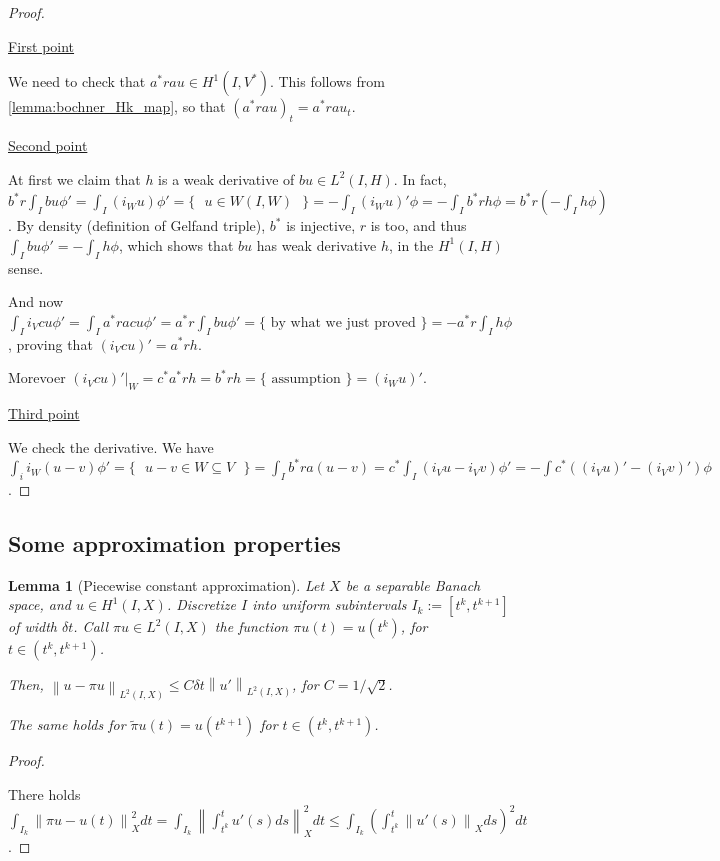 \documentclass[english,a4paper,9pt,oneside]{scrbook}	%
\theoremstyle{break}
\newtheorem{lemma}[equation]{Lemma}
\newenvironment{mproof}[1][\proofname]{%
  \begin{proof}[#1]$ $\par\nobreak\ignorespaces
}{%
  \end{proof}
}
\renewcommand*{\proofname}{Proof}
\theoremstyle{remark}
\newcommand{\ds}{\displaystyle}
\newcommand{\norm}[1]{\left\lVert#1\right\rVert}
\newcommand{\ind}[1]{\{\text{ #1 }\}}
\newcommand{\mind}[1]{$#1$}
\begin{document}
\begin{appendices}
\begin{mproof}
\underline{First point}

We need to check that $a^* r a u \in H^1(I, V^*)$. This follows from \cref{lemma:bochner_Hk_map}, so that $(a^* r a u)_t = a^* r a u_t$.

\underline{Second point}

At first we claim that $h$ is a weak derivative of $bu \in L^2(I,H)$. In fact, $b^* r \int_I bu \phi' = \int_I (i_W u)\phi' = \ind{\mind{u \in W(I,W)}} =-\int_I(i_Wu)'\phi=-\int_I b^*r h\phi = b^*r (-\int_I h \phi)$. By density (definition of Gelfand triple), $b^*$ is injective, $r$ is too, and thus $\int_I bu \phi' = -\int_I h \phi$, which shows that $bu$ has weak derivative $h$, in the $H^1(I,H)$ sense.

And now $\int_I i_V c u \phi'= \int_I a^*racu \phi' = a^*r\int_I bu\phi' = \ind{by what we just proved}=-a^*r \int_I h \phi$, proving that $(i_V cu)'=a^*r h$.

Morevoer $(i_V cu)'|_W = c^*a^*r h=b^*rh=\ind{assumption} = (i_W u)'$.

\underline{Third point}

We check the derivative. We have $\int_i i_W(u-v)\phi' =\ind{\mind{u-v \in W\subseteq V}} = \int_I b^* r a (u-v) = c^*\int_I(i_Vu - i_Vv)\phi' = -\int c^*((i_V u)'- (i_V v)')\phi$.

\end{mproof}

\subsection{Some approximation properties}

\begin{lemma}[Piecewise constant approximation]
\label{lemma:pw_constant_appr}
Let $X$ be a separable Banach space, and $u \in H^1(I,X)$. Discretize $I$ into uniform subintervals $I_k:=[t^k,t^{k+1}]$ of width $\delta t$. Call $\pi u \in L^2(I,X)$ the function $\pi u(t)=u(t^{k})$, for $t \in (t^k,t^{k+1})$.

Then, $\norm{u-\pi u}_{L^2(I,X)}\leq C \delta t \norm{u'}_{L^2(I,X)}$, for $C=1/\sqrt{2}$.


The same holds for $\tilde{\pi}u(t) = u(t^{k+1})$ for $t \in (t^k,t^{k+1})$.

\end{lemma}

\begin{mproof}
There holds $\ds \int_{I_k}\norm{\pi u - u(t)}_X^2 dt = \int_{I_k} \norm{\int_{t^k}^{t} u'(s)ds}_X^2 dt\leq \int_{I_k}\left ( \int_{t^k}^{t} \norm{u'(s)}_X ds \right )^2 dt$. 


\end{mproof}
\end{appendices}
\end{document}

